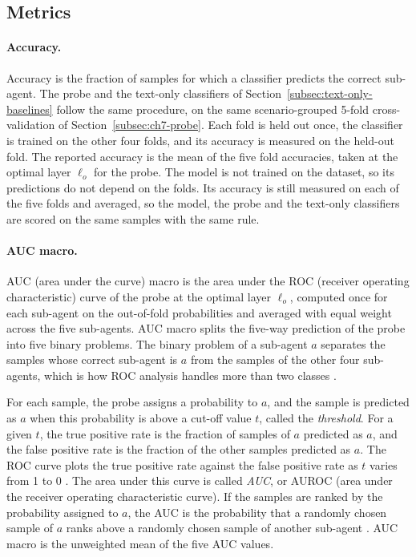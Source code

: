 \subsection{Metrics}
\label{subsec:ch7-metrics}

\paragraph{Accuracy.} Accuracy is the fraction of samples for which a classifier predicts the correct sub-agent. The probe and the text-only classifiers of Section~\ref{subsec:text-only-baselines} follow the same procedure, on the same scenario-grouped 5-fold cross-validation of Section~\ref{subsec:ch7-probe}. Each fold is held out once, the classifier is trained on the other four folds, and its accuracy is measured on the held-out fold. The reported accuracy is the mean of the five fold accuracies, taken at the optimal layer $\ell_o$ for the probe. The model is not trained on the dataset, so its predictions do not depend on the folds. Its accuracy is still measured on each of the five folds and averaged, so the model, the probe and the text-only classifiers are scored on the same samples with the same rule.

\paragraph{AUC macro.} AUC (area under the curve) macro is the area under the ROC (receiver operating characteristic) curve of the probe at the optimal layer $\ell_o$, computed once for each sub-agent on the out-of-fold probabilities and averaged with equal weight across the five sub-agents. AUC macro splits the five-way prediction of the probe into five binary problems. The binary problem of a sub-agent $a$ separates the samples whose correct sub-agent is $a$ from the samples of the other four sub-agents, which is how ROC analysis handles more than two classes \cite{fawcettIntroductionROCAnalysis2006}.

For each sample, the probe assigns a probability to $a$, and the sample is predicted as $a$ when this probability is above a cut-off value $t$, called the \emph{threshold}. For a given $t$, the true positive rate is the fraction of samples of $a$ predicted as $a$, and the false positive rate is the fraction of the other samples predicted as $a$. The ROC curve plots the true positive rate against the false positive rate as $t$ varies from 1 to 0 \cite{fawcettIntroductionROCAnalysis2006}. The area under this curve is called \emph{AUC}, or AUROC (area under the receiver operating characteristic curve). If the samples are ranked by the probability assigned to $a$, the AUC is the probability that a randomly chosen sample of $a$ ranks above a randomly chosen sample of another sub-agent \cite{fawcettIntroductionROCAnalysis2006}. AUC macro is the unweighted mean of the five AUC values.

